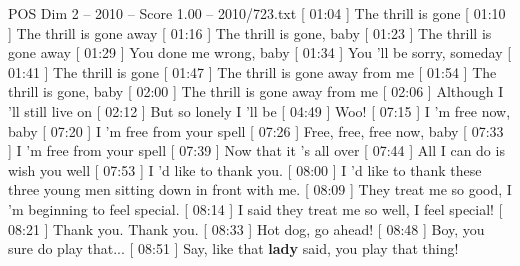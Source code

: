 \begin{textsample}{POS Dim 2 – 2010 – Score 1.00 – 2010/723.txt}  \label{ex:f2_pos_039}
[ 01:04 ] The thrill is gone [ 01:10 ] The thrill is gone away [ 01:16 ] The thrill is gone, baby [ 01:23 ] The thrill is gone away [ 01:29 ] You done me wrong, baby [ 01:34 ] You 'll be sorry, someday [ 01:41 ] The thrill is gone [ 01:47 ] The thrill is gone away from me [ 01:54 ] The thrill is gone, baby [ 02:00 ] The thrill is gone away from me [ 02:06 ] Although I 'll still live on [ 02:12 ] But so lonely I 'll be [ 04:49 ] Woo! [ 07:15 ] I 'm free now, baby [ 07:20 ] I 'm free from your spell [ 07:26 ] Free, free, free now, baby [ 07:33 ] I 'm free from your spell [ 07:39 ] Now that it 's all over [ 07:44 ] All I can do is wish you well [ 07:53 ] I 'd like to thank you. [ 08:00 ] I 'd like to thank these three young men sitting down in front with me. [ 08:09 ] They treat me so good, I 'm beginning to feel special. [ 08:14 ] I said they treat me so well, I feel special! [ 08:21 ] Thank you.
Thank you. [ 08:33 ] Hot dog, go ahead! [ 08:48 ] Boy, you sure do play that... [ 08:51 ] Say, like that \textbf{lady} said, you play that thing!

\end{textsample}
